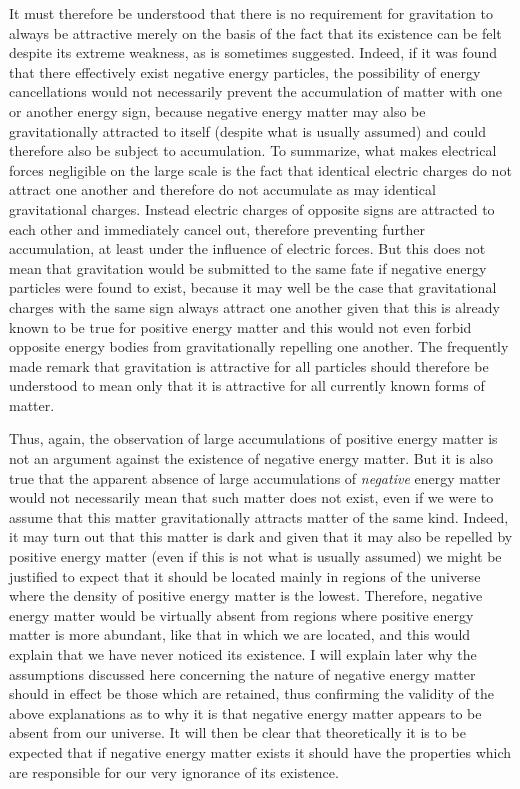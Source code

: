 \documentclass[notitlepage,12pt]{report}
\begin{document}
It must therefore be understood that there is no requirement for gravitation to always be attractive merely on the basis of the fact that its existence can be felt despite its extreme weakness, as is sometimes suggested. Indeed, if it was found that there effectively exist negative energy particles, the possibility of energy cancellations would not necessarily prevent the accumulation of matter with one or another energy sign, because negative energy matter may also be gravitationally attracted to itself (despite what is usually assumed) and could therefore also be subject to accumulation. To summarize, what makes electrical forces negligible on the large scale is the fact that identical electric charges do not attract one another and therefore do not accumulate as may identical gravitational charges. Instead electric charges of opposite signs are attracted to each other and immediately cancel out, therefore preventing further accumulation, at least under the influence of electric forces. But this does not mean that gravitation would be submitted to the same fate if negative energy particles were found to exist, because it may well be the case that gravitational charges with the same sign always attract one another given that this is already known to be true for positive energy matter and this would not even forbid opposite energy bodies from gravitationally repelling one another. The frequently made remark that gravitation is attractive for all particles should therefore be understood to mean only that it is attractive for all currently known forms of matter.

Thus, again, the observation of large accumulations of positive energy matter is not an argument against the existence of negative energy matter. But it is also true that the apparent absence of large accumulations of \textit{negative} energy matter would not necessarily mean that such matter does not exist, even if we were to assume that this matter gravitationally attracts matter of the same kind. Indeed, it may turn out that this matter is dark and given that it may also be repelled by positive energy matter (even if this is not what is usually assumed) we might be justified to expect that it should be located mainly in regions of the universe where the density of positive energy matter is the lowest. Therefore, negative energy matter would be virtually absent from regions where positive energy matter is more abundant, like that in which we are located, and this would explain that we have never noticed its existence. I will explain later why the assumptions discussed here concerning the nature of negative energy matter should in effect be those which are retained, thus confirming the validity of the above explanations as to why it is that negative energy matter appears to be absent from our universe. It will then be clear that theoretically it is to be expected that if negative energy matter exists it should have the properties which are responsible for our very ignorance of its existence.
\end{document}
